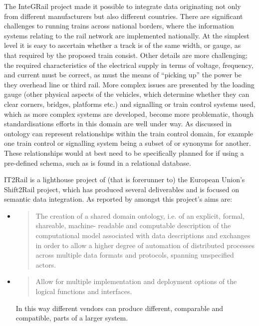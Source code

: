 The InteGRail project made it possible to integrate data originating not only from different manufacturers but also different countries. There are significant challenges to running trains across national borders, where the information systems relating to the rail network are implemented nationally. At the simplest level it is easy to ascertain whether a track is of the same width, or gauge, as that required by the proposed train consist. Other details are more challenging; the required characteristics of the electrical supply in terms of voltage, frequency, and current must be correct, as must the means of ``picking up'' the power be they overhead line or third rail. More complex issues are presented by the loading gauge (other physical aspects of the vehicles, which determine whether they can clear corners, bridges, platforms etc.) and signalling or train control systems used, which as more complex systems are developed, become more problematic, though standardisations efforts in this domain are well under way. As discussed in \citet{Verstichel2011} ontology can represent relationships within the train control domain, for example one train control or signalling system being a subset of or synonyms for another. These relationships would at best need to be specifically planned for if using a pre-defined schema, such as is found in a relational database.

IT2Rail is a lighthouse project of (that is forerunner to) the European Union's Shift2Rail project, which has produced several deliverables and is focused on semantic data integration. As reported by \citet{Gogos2016} amongst this project's aims are:
\begin{itemize}
    \item 
    \begin{quote}
    The creation of a shared domain ontology, i.e. of an explicit, formal, shareable, machine-
readable and computable description of the computational model associated with data
descriptions and exchanges in order to allow a higher degree of automation of distributed
processes across multiple data formats and protocols, spanning unspecified actors.
    \end{quote}
    \item 
    \begin{quote}
    Allow for multiple implementation and deployment options of the logical functions and
interfaces.
    \end{quote}
 In this way different vendors can produce different, comparable and compatible, parts of a larger system.
\end{itemize}

